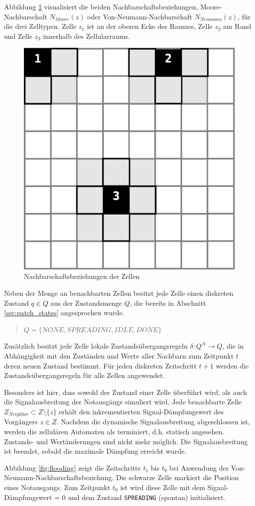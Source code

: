Abbildung \ref{fig:neighborhood} visualisiert die beiden Nachbarschaftsbeziehungen, Moore-Nachbarschaft $ N_{Moore}(z)$ oder Von-Neumann-Nachbarschaft $ N_{Neumann}(z)$, für die drei Zelltypen. Zelle $z_{1}$ ist an der oberen Ecke des Raumes, Zelle $z_{2}$ am Rand und Zelle $z_{3}$ innerhalb des Zellularraums. 

\begin{figure}[!ht]
\centering
\includegraphics[height=0.3\textwidth]{algorithmik/neighborhood.eps}
\caption{Nachbarschaftsbeziehungen der Zellen}
\label{fig:neighborhood}
\end{figure}

Neben der Menge an benachbarten Zellen besitzt jede Zelle einen diskreten Zustand $q \in Q$ aus der Zustandsmenge $Q$, die bereits in Abschnitt \ref{sec:patch_states} angesprochen wurde.

\begin{quote}
$Q = \{NONE, SPREADING, IDLE, DONE\}$
\end{quote}

Zusätzlich besitzt jede Zelle lokale Zustandsübergangsregeln $\delta \colon Q^{N}\to Q$, die in Abhängigkeit mit den Zuständen und Werte aller Nachbarn zum Zeitpunkt $t$ deren neuen Zustand bestimmt. Für jeden diskreten Zeitschritt $t + 1$ werden die Zustandsübergangsregeln für alle Zellen angewendet.

Besonders ist hier, dass sowohl der Zustand einer Zelle überführt wird, als auch die Signalausbreitung der Notausgänge simuliert wird. Jede benachbarte Zelle $Z_{Neighbor} \subset Z\setminus\{z\}$ erhält den inkrementierten Signal-Dämpfungswert des Vorgängers $z \in Z$. Nachdem die dynamische Signalausbreitung abgeschlossen ist, werden die zellulären Automaten als terminiert, d.h. statisch angesehen. Zustands- und Wertänderungen sind nicht mehr möglich. Die Signalausbreitung ist beendet, sobald die maximale Dämpfung erreicht wurde.

Abbildung \ref{fig:flooding} zeigt die Zeitschritte $t_{1}$ bis $t_{9}$ bei Anwendung der Von-Neumann-Nachbarschaftsbeziehung. Die schwarze Zelle markiert die Position eines Notausgangs. Zum Zeitpunkt $t_{0}$ ist wird diese Zelle mit dem Signal-Dämpfungswert = 0 und dem Zustand \verb|SPREADING| (spontan) initialisiert.

